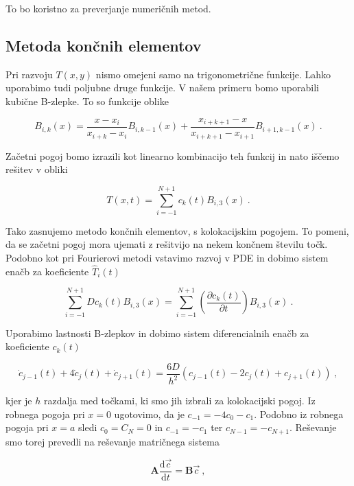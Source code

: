 \documentclass[a4paper]{article}
\newcommand{\ddd}{\mathrm{d}}
\begin{document}
To bo koristno za preverjanje numeričnih metod.\\
\subsection{Metoda končnih elementov}
Pri razvoju $T(x,y)$ nismo omejeni samo na trigonometrične funkcije. Lahko uporabimo tudi
poljubne druge funkcije. V našem primeru bomo uporabili kubične B-zlepke. To so funkcije
oblike

\begin{equation}
    B_{i, k}(x) = \frac{x-x_i}{x_{i+k}-x_i}B_{i, k-1}(x) + \frac{x_{i+k+1}-x}{x_{i+k+1}-x_{i+1}}B_{i+1, k-1}(x)\>.
\end{equation}

Začetni pogoj bomo izrazili kot linearno kombinacijo teh funkcij in nato iščemo rešitev
v obliki

\begin{equation}
    T(x, t) = \sum_{i=-1}^{N+1}{c_k(t)B_{i, 3}(x)}\>.
\end{equation}

Tako zasnujemo metodo končnih elementov, s kolokacijskim pogojem. To pomeni, da se začetni
pogoj mora ujemati z rešitvijo na nekem končnem številu točk. Podobno kot pri Fourierovi metodi
vstavimo razvoj v PDE in dobimo sistem enačb za koeficiente $\hat{T}_i(t)$

\begin{equation}
    \sum_{i=-1}^{N+1}{D c_k(t)B_{i, 3}(x)} = 
    \sum_{i=-1}^{N+1}{\left(\frac{\partial c_k(t)}{\partial t}\right)B_{i, 3}(x)}\>.
\end{equation}

Uporabimo lastnosti B-zlepkov in dobimo sistem diferencialnih enačb za koeficiente $c_k(t)$

\begin{equation}
    \dot{c}_{j-1}(t) + 4\dot{c}_{j}(t) + \dot{c}_{j+1}(t) = \frac{6D}{h^2}(c_{j-1}(t) - 2c_j(t) + c_{j+1}(t))\>,
\end{equation}

kjer je $h$ razdalja med točkami, ki smo jih izbrali za kolokacijski pogoj. Iz robnega pogoja pri $x=0$
ugotovimo, da je $c_{-1} = -4c_0-c_1$. Podobno iz robnega pogoja pri $x=a$ sledi $c_0 = C_N = 0$ in $c_{-1} = -c_1$
ter $c_{N-1} = -c_{N+1}$. Reševanje smo torej prevedli na reševanje matričnega sistema

\begin{equation}
    \mathbf{A} \frac{\ddd \vec{c}}{\ddd t} = \mathbf{B}\vec{c}\>,
\end{equation}
\end{document}

